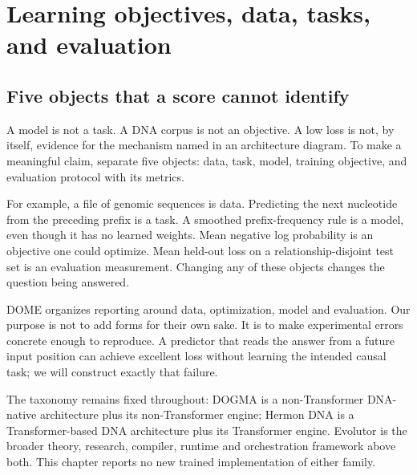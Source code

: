 \chapter{Learning objectives, data, tasks, and evaluation}\label{ch:e2}

\section{Five objects that a score cannot identify}
A model is not a task. A DNA corpus is not an objective. A low loss is not, by itself, evidence for the mechanism named in an architecture diagram. To make a meaningful claim, separate five objects: data, task, model, training objective, and evaluation protocol with its metrics.


For example, a file of genomic sequences is data. Predicting the next nucleotide from the preceding prefix is a task. A smoothed prefix-frequency rule is a model, even though it has no learned weights. Mean negative log probability is an objective one could optimize. Mean held-out loss on a relationship-disjoint test set is an evaluation measurement. Changing any of these objects changes the question being answered.

DOME organizes reporting around data, optimization, model and evaluation.\cite{e2dome} Our purpose is not to add forms for their own sake. It is to make experimental errors concrete enough to reproduce. A predictor that reads the answer from a future input position can achieve excellent loss without learning the intended causal task; we will construct exactly that failure.

The taxonomy remains fixed throughout: DOGMA is a non-Transformer DNA-native architecture plus its non-Transformer engine; Hermon DNA is a Transformer-based DNA architecture plus its Transformer engine. Evolutor is the broader theory, research, compiler, runtime and orchestration framework above both. This chapter reports no new trained implementation of either family.

